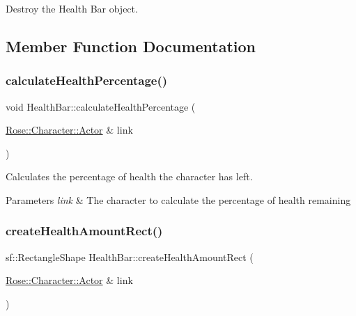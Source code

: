 Destroy the Health Bar object. 



\subsection{Member Function Documentation}
\mbox{\label{classHealthBar_a61e6713d7078197e549d5d979d2b34c6}} 
\subsubsection{\texorpdfstring{calculateHealthPercentage()}{calculateHealthPercentage()}}
{\footnotesize\ttfamily void Health\+Bar\+::calculate\+Health\+Percentage (\begin{DoxyParamCaption}\item[{\mbox{\hyperlink{classRose_1_1Character_1_1Actor}{Rose\+::\+Character\+::\+Actor}} \&}]{link }\end{DoxyParamCaption})}



Calculates the percentage of health the character has left. 


\begin{DoxyParams}{Parameters}
{\em link} & The character to calculate the percentage of health remaining \\
\hline
\end{DoxyParams}
\mbox{\label{classHealthBar_ab6275c757258bfa46f6416201bdd3c83}} 
\subsubsection{\texorpdfstring{createHealthAmountRect()}{createHealthAmountRect()}}
{\footnotesize\ttfamily sf\+::\+Rectangle\+Shape Health\+Bar\+::create\+Health\+Amount\+Rect (\begin{DoxyParamCaption}\item[{\mbox{\hyperlink{classRose_1_1Character_1_1Actor}{Rose\+::\+Character\+::\+Actor}} \&}]{link }\end{DoxyParamCaption})}




